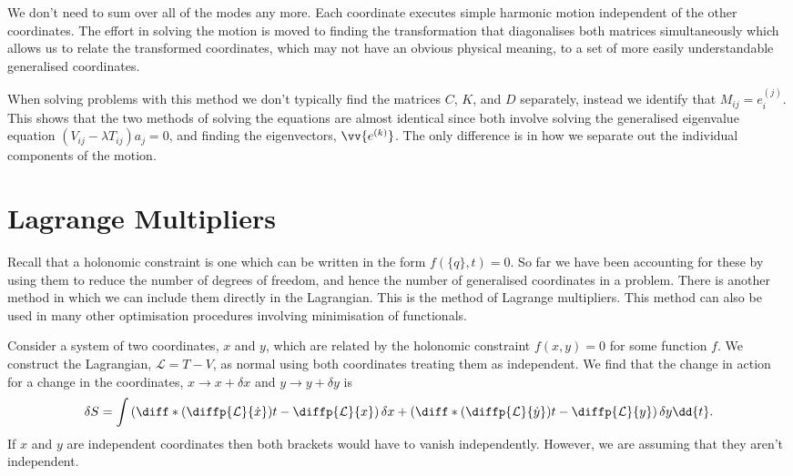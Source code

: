 \documentclass[fleqn]{NotesClass}
\newcommand*{\lagrangian}{\mathcal{L}}
\begin{document}
    We don't need to sum over all of the modes any more.
    Each coordinate executes simple harmonic motion independent of the other coordinates.
    The effort in solving the motion is moved to finding the transformation that diagonalises both matrices simultaneously which allows us to relate the transformed coordinates, which may not have an obvious physical meaning, to a set of more easily understandable generalised coordinates.
    
    When solving problems with this method we don't typically find the matrices \(C\), \(K\), and \(D\) separately, instead we identify that \(M_{ij} = e_i^{(j)}\).
    This shows that the two methods of solving the equations are almost identical since both involve solving the generalised eigenvalue equation \((V_{ij} - \lambda T_{ij})a_j = 0\), and finding the eigenvectors, \(\vv{e^{(k)}}\).
    The only difference is in how we separate out the individual components of the motion.
    
    \chapter{Lagrange Multipliers}
    Recall that a holonomic constraint is one which can be written in the form \(f(\{q\}, t) = 0\).
    So far we have been accounting for these by using them to reduce the number of degrees of freedom, and hence the number of generalised coordinates in a problem.
    There is another method in which we can include them directly in the Lagrangian.
    This is the method of Lagrange multipliers.
    This method can also be used in many other optimisation procedures involving minimisation of functionals.
    
    Consider a system of two coordinates, \(x\) and \(y\), which are related by the holonomic constraint \(f(x, y) = 0\) for some function \(f\).
    We construct the Lagrangian, \(\lagrangian = T - V\), as normal using both coordinates treating them as independent.
    We find that the change in action for a change in the coordinates, \(x \to x + \delta x\) and \(y \to y + \delta y\) is
    \begin{equation}
        \delta S = \int \left( \diff*{\left( \diffp{\lagrangian}{\dot{x}} \right)}{t} - \diffp{\lagrangian}{x} \right)\delta x + \left( \diff*{\left( \diffp{\lagrangian}{\dot{y}} \right)}{t} - \diffp{\lagrangian}{y} \right)\delta y \dd{t}.
    \end{equation}
    If \(x\) and \(y\) are independent coordinates then both brackets would have to vanish independently.
    However, we are assuming that they aren't independent.
    
\end{document}
